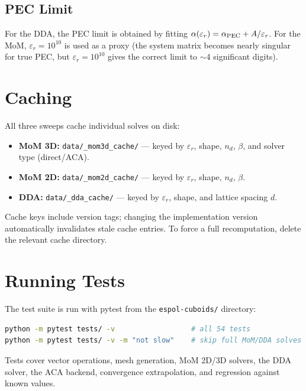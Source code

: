 \documentclass[a4paper,11pt]{article}
\begin{document}
\subsection{PEC Limit}

For the DDA, the PEC limit is obtained by fitting
$\alpha(\varepsilon_r) = \alpha_{\rm PEC} + A/\varepsilon_r$.
For the MoM, $\varepsilon_r = 10^{10}$ is used as a proxy (the
system matrix becomes nearly singular for true PEC, but
$\varepsilon_r = 10^{10}$ gives the correct limit to $\sim$4 significant
digits).

\section{Caching}

All three sweeps cache individual solves on disk:

\begin{itemize}
    \item \textbf{MoM 3D:} \texttt{data/\_mom3d\_cache/} — keyed by
          $\varepsilon_r$, shape, $n_d$, $\beta$, and solver type
          (direct/ACA).
    \item \textbf{MoM 2D:} \texttt{data/\_mom2d\_cache/} — keyed by
          $\varepsilon_r$, shape, $n_d$, $\beta$.
    \item \textbf{DDA:} \texttt{data/\_dda\_cache/} — keyed by
          $\varepsilon_r$, shape, and lattice spacing $d$.
\end{itemize}

Cache keys include version tags; changing the implementation version
automatically invalidates stale cache entries.  To force a full
recomputation, delete the relevant cache directory.

\section{Running Tests}

The test suite is run with pytest from the \texttt{espol-cuboids/} directory:

\begin{lstlisting}[language=bash]
python -m pytest tests/ -v                  # all 54 tests
python -m pytest tests/ -v -m "not slow"    # skip full MoM/DDA solves
\end{lstlisting}

Tests cover vector operations, mesh generation, MoM 2D/3D solvers, the
DDA solver, the ACA backend, convergence extrapolation, and regression
against known values.
\end{document}
